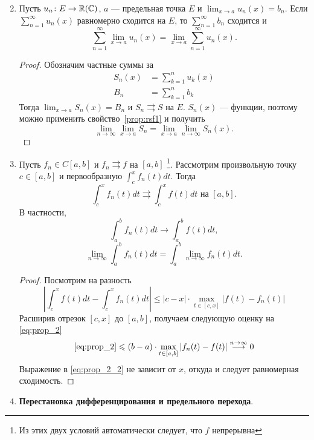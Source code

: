 \begin{enumerate}
	\setcounter{enumi}{1}
\item Пусть $ u_n \colon E \to  \R(\Cm)$, $ a$ --- предельная точка $ E$ и $ \lim_{x \to  a} u_n(x) = b_n$. Если $ \sum_{n=1}^{\infty}u_n(x) $ равномерно сходится на $ E$, то   $ \sum_{n=1}^{\infty} b_n$ сходится и
	\[
		\sum_{n=1}^{\infty}  \lim_{x \to  a} u_n(x) = \lim_{x \to  a} \sum_{n=1}^{\infty} u_n(x)
	.\]
	\begin{proof}
		Обозначим частные суммы за
		\[
			\begin{aligned}
				S_n(x) &= \sum_{k=1}^{n} u_k(x) \\
				B_n &= \sum_{k=1}^{n} b_k
			\end{aligned}
		\]
		Тогда $ \lim_{x \to  a} S_n(x) = B_n$ и $ S_n \rightrightarrows S$ на $ E$.  $ S_n(x)$ --- функции, поэтому можно применить свойство~\ref{prop:rsf1} и получить
		\[
			\lim_{n \to \infty} \lim_{x \to a} S_n = \lim_{x \to a} \lim_{n \to \infty} S_n(x)
		.\]
	\end{proof}
\item Пусть  $ f_n \in C[a, b]$ и $ f_{n} \rightrightarrows f$ на $ [a, b]$ \footnote{Из этих двух условий автоматически следует, что $ f$ непрерывна}. Рассмотрим произвольную точку  $ c \in [a, b]$ и первообразную $ \int_{c}^{x} f_{n}(t)dt $. Тогда 
	\[
		\int_{c}^{x} f_n(t)dt \rightrightarrows \int_{c}^{x} f(t)dt \text{ на } [a, b]  
	.\] 
	В частности,
	\[
		\int_{a}^{b} f_n(t)dt \to \int_{a}^{b} f(t) dt  
	,\] 
	\[
		\lim_{n \to \infty} \int_{a}^{b} f_n(t)dt = \int_{a}^{b} \lim_{n \to \infty} f_n(t)dt  
	.\] 
	\begin{proof}
	    Посмотрим на разность 
		\begin{equation}\label{eq:prop_2}
			\left| \int_{c}^{x} f(t) dt - \int_{c}^{x} f_n(t) dt   \right| \le \left| c  - x \right| \cdot \max_{t \in [c, x]} \left| f(t) - f_n(t) \right| 
		\end{equation}
		Расширив отрезок $ [c, x]$ до $ [a, b]$, получаем следующую оценку на \ref{eq:prop_2}
		\begin{equation}\label{eq:prop_2_2}
			\ref{eq:prop_2} \le (b-a) \cdot \max_{t \in [a, b]}\left| f_n(t) - f(t) \right| \stackrel{n \to  \infty}{\longrightarrow} 0
		\end{equation}
		Выражение в \ref{eq:prop_2_2} не зависит от $ x$, откуда и следует равномерная сходимость.
	\end{proof}
\item {\bf Перестановка дифференцирования и предельного перехода}.

\end{enumerate}
